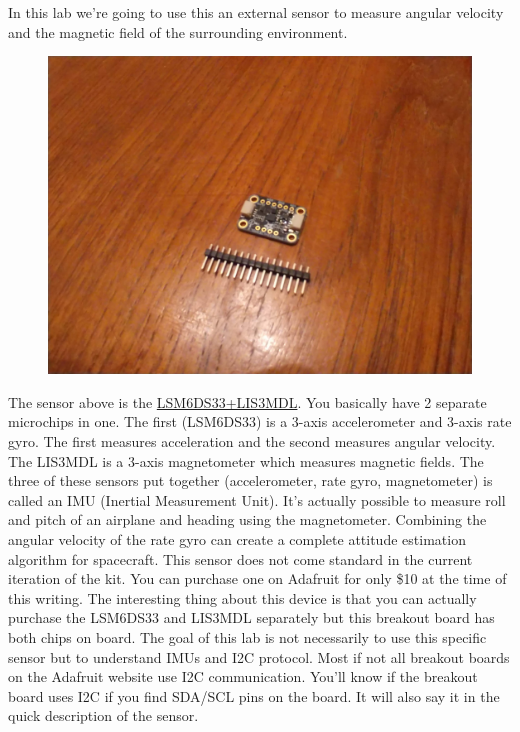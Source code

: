 In this lab we’re going to use this an external sensor to measure angular velocity and the magnetic field of the surrounding environment.
\begin{figure}[H]
  \begin{center}
    \includegraphics[width=\textwidth]{Figures/imu.jpeg}
  \end{center}
\end{figure}
The sensor above is the \href{https://www.adafruit.com/product/4485}{LSM6DS33+LIS3MDL}. You basically have 2 separate microchips in one. The first (LSM6DS33) is a 3-axis accelerometer and 3-axis rate gyro. The first measures acceleration and the second measures angular velocity. The LIS3MDL is a 3-axis magnetometer which measures magnetic fields. The three of these sensors put together (accelerometer, rate gyro, magnetometer) is called an IMU (Inertial Measurement Unit). It's actually possible to measure roll and pitch of an airplane and heading using the magnetometer. Combining the angular velocity of the rate gyro can create a complete attitude estimation algorithm for spacecraft. This sensor does not come standard in the current iteration of the kit. You can purchase one on Adafruit for only \$10 at the time of this writing. The interesting thing about this device is that you can actually purchase the LSM6DS33 and LIS3MDL separately but this breakout board has both chips on board. The goal of this lab is not necessarily to use this specific sensor but to understand IMUs and I2C protocol. Most if not all breakout boards on the Adafruit website use I2C communication. You'll know if the breakout board uses I2C if you find SDA/SCL pins on the board. It will also say it in the quick description of the sensor.
